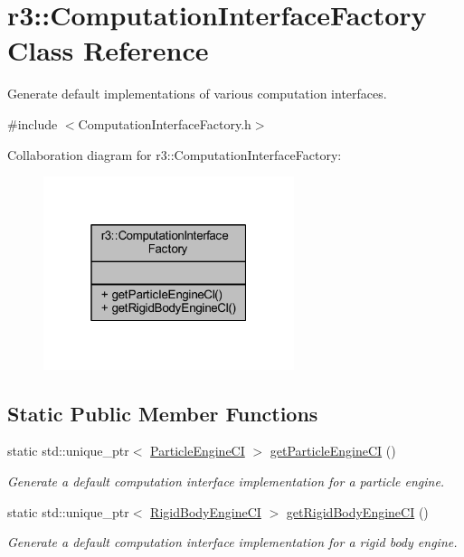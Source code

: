 \hypertarget{classr3_1_1_computation_interface_factory}{}\section{r3\+:\+:Computation\+Interface\+Factory Class Reference}
\label{classr3_1_1_computation_interface_factory}


Generate default implementations of various computation interfaces.  




{\ttfamily \#include $<$Computation\+Interface\+Factory.\+h$>$}



Collaboration diagram for r3\+:\+:Computation\+Interface\+Factory\+:\nopagebreak
\begin{figure}[H]
\begin{center}
\leavevmode
\includegraphics[width=208pt]{classr3_1_1_computation_interface_factory__coll__graph}
\end{center}
\end{figure}
\subsection*{Static Public Member Functions}
\begin{DoxyCompactItemize}
\item 
static std\+::unique\+\_\+ptr$<$ \mbox{\hyperlink{classr3_1_1_particle_engine_c_i}{Particle\+Engine\+CI}} $>$ \mbox{\hyperlink{classr3_1_1_computation_interface_factory_a7b9e6f01921567e1530aac9c10e8a7c0}{get\+Particle\+Engine\+CI}} ()
\begin{DoxyCompactList}\small\item\em Generate a default computation interface implementation for a particle engine. \end{DoxyCompactList}\item 
static std\+::unique\+\_\+ptr$<$ \mbox{\hyperlink{classr3_1_1_rigid_body_engine_c_i}{Rigid\+Body\+Engine\+CI}} $>$ \mbox{\hyperlink{classr3_1_1_computation_interface_factory_a9bc878f2dbfe7dbca2037ba0d5180a5a}{get\+Rigid\+Body\+Engine\+CI}} ()
\begin{DoxyCompactList}\small\item\em Generate a default computation interface implementation for a rigid body engine. \end{DoxyCompactList}\end{DoxyCompactItemize}


